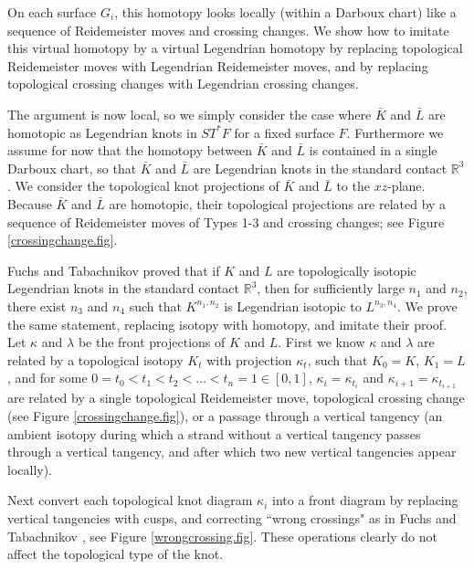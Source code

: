 On each surface $G_i$, this homotopy looks locally (within a Darboux chart) like a sequence of Reidemeister moves and crossing changes. We show how to imitate this virtual homotopy by a virtual Legendrian homotopy by replacing topological Reidemeister moves with Legendrian Reidemeister moves, and by replacing topological crossing changes with Legendrian crossing changes.
 
The argument is now local, so we simply consider the case where $\bar{K}$ and $\bar{L}$ are homotopic as Legendrian knots in $ST^*F$ for a fixed surface $F$.  Furthermore we assume for now that the homotopy between $\bar{K}$ and $\bar{L}$ is contained in a single Darboux chart, so that $\bar{K}$ and $\bar{L}$ are Legendrian knots in the standard contact $\mathbb{R}^3$.  We consider the topological knot projections of $\bar{K}$ and $\bar{L}$ to the $xz$-plane.  Because $\bar{K}$ and $\bar{L}$ are homotopic, their topological projections are related by a sequence of Reidemeister moves of Types 1-3 and crossing changes; see Figure \ref{crossingchange.fig}.

Fuchs and Tabachnikov \cite{ft} proved that if $K$ and $L$ are topologically isotopic Legendrian knots in the standard contact $\mathbb{R}^3$, then  for sufficiently large $n_1$ and $n_2$, there exist  $n_3$ and $n_4$ such that $K^{n_1, n_2}$ is Legendrian isotopic to $L^{n_3, n_4}$.  We prove the same statement, replacing isotopy with homotopy, and imitate their proof.  Let $\kappa$ and $\lambda$ be the front projections of $K$ and $L$. First we know $\kappa$ and $\lambda$ are related by a topological isotopy $K_t$ with projection $\kappa_t$, such that $K_0=K$, $K_1=L$, and for some $0=t_0<t_1< t_2 < \dots <t_n=1 \in [0,1]$, $\kappa_i=\kappa_{t_i}$ and $\kappa_{i+1}=\kappa_{t_{i+1}}$ are related by a single topological Reidemeister move, topological crossing change (see Figure \ref{crossingchange.fig}), or a passage through a vertical tangency (an ambient isotopy during which a strand without a vertical tangency passes through a vertical tangency, and after which two new vertical tangencies appear locally).

Next convert each topological knot diagram $\kappa_i$ into a front diagram by replacing vertical tangencies with cusps, and correcting ``wrong crossings" as in Fuchs and Tabachnikov \cite{ft}, see Figure \ref{wrongcrossing.fig}.  These operations clearly do not affect the topological type of the knot.

